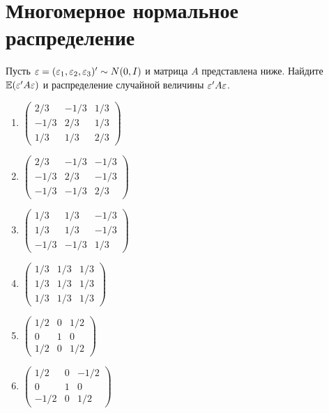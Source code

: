 \documentclass[pdftex,11pt,openany]{book}\usepackage[]{graphicx}\usepackage[]{color}
\begin{document}
\begin{solution}
\end{solution}


\chapter{Многомерное нормальное распределение} %

\begin{problem}
Пусть $\varepsilon = (\varepsilon_1, \varepsilon_2, \varepsilon_3)'\sim N (0,I)$ и матрица $A$ представлена ниже. Найдите $\mathbb{E}(\varepsilon'A\varepsilon)$ и распределение случайной величины $\varepsilon'A\varepsilon$.

\begin{enumerate}
\item 
$\begin{pmatrix} 2/3 & -1/3 & 1/3 \\ -1/3 & 2/3 & 1/3 \\ 1/3 & 1/3 & 2/3 \end{pmatrix}$

\item 
$\begin{pmatrix} 2/3 & -1/3 & -1/3 \\ -1/3 & 2/3 & -1/3 \\ -1/3 & -1/3 & 2/3 \end{pmatrix}$

\item 
$\begin{pmatrix} 1/3 & 1/3 & -1/3 \\ 1/3 & 1/3 & -1/3 \\ -1/3 & -1/3 & 1/3 \end{pmatrix}$

\item
$\begin{pmatrix} 1/3 & 1/3 & 1/3 \\ 1/3 & 1/3 & 1/3 \\ 1/3 & 1/3 & 1/3 \end{pmatrix}$

\item
$\begin{pmatrix} 1/2 & 0 & 1/2 \\ 0 & 1 & 0 \\ 1/2 & 0 & 1/2 \end{pmatrix}$

\item
$\begin{pmatrix} 1/2 & 0 & -1/2 \\ 0 & 1 & 0 \\ -1/2 & 0 & 1/2 \end{pmatrix}$


\end{enumerate}
\end{problem}
\end{document}
